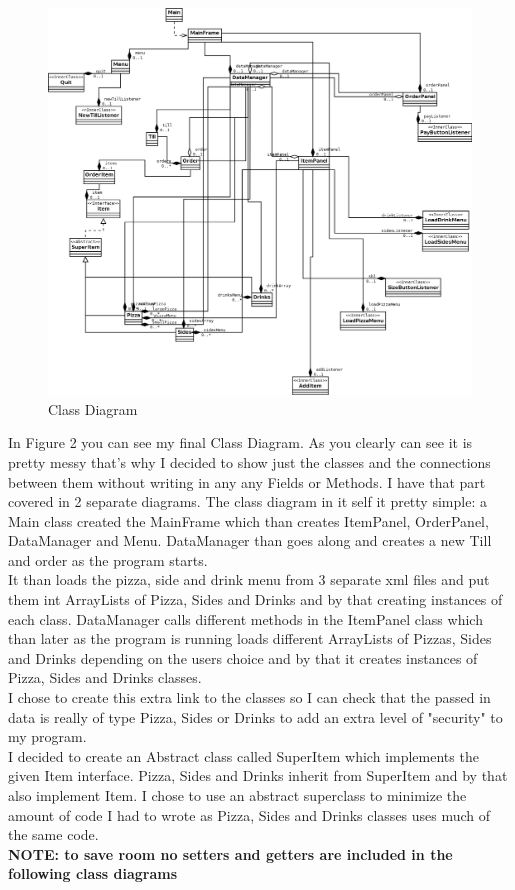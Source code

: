 \documentclass[11pt,a4paper]{article}
\begin{document}
\begin{flushleft}
\begin{figure}[h]
	\centering
 	\includegraphics[width = 1\textwidth]{../Dia/classDiagram.png} 
	\caption{Class Diagram}
	\label{fig2}
\end{figure}


In Figure 2 you can see my final Class Diagram. As you clearly can see it is pretty messy that's why I decided to show just the classes and the connections between them without writing in any any Fields or Methods. I have that part covered in 2 separate diagrams.
The class diagram in it self it pretty simple: a Main class created the MainFrame which than creates ItemPanel, OrderPanel, DataManager and Menu. DataManager than goes along and creates a new Till and order as the program starts.\\ 
It than loads the pizza, side and drink menu from 3 separate xml files and put them int ArrayLists of Pizza, Sides and Drinks and by that creating instances of each class. 
DataManager calls different methods in the ItemPanel class which than later as the program is running loads different ArrayLists of Pizzas, Sides and Drinks depending on the users choice and by that it creates instances of Pizza, Sides and Drinks classes.\\
I chose to create this extra link to the classes  so I can check that the passed in data is really of type Pizza, Sides or Drinks to add an extra level of "security" to my program.\\
I decided to create an Abstract class called SuperItem which implements the given Item interface. Pizza, Sides and Drinks inherit from SuperItem and by that also implement Item.
I chose to use an abstract superclass to minimize the amount of code I had to wrote as Pizza, Sides and Drinks classes uses much of the same code.\\ 
\textbf{NOTE: to save room no setters and getters are included in the following class diagrams}
\newpage


\end{flushleft}
\end{document}
